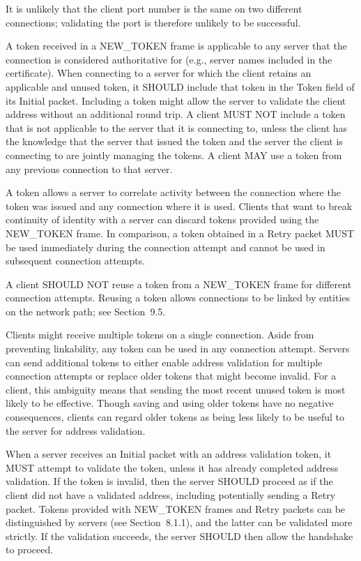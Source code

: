 \documentclass{article}
\begin{document}
It is unlikely that the client port number is the same on two different connections; validating the port is therefore unlikely to be successful.

A token received in a NEW\_TOKEN frame is applicable to any server that the connection is considered authoritative for (e.g., server names included in the certificate).  When connecting to a server for which the client retains an applicable and unused token, it SHOULD include that token in the Token field of its Initial packet. Including a token might allow the server to validate the client address without an additional round trip.  A client MUST NOT include a token that is not applicable to the server that it is connecting to, unless the client has the knowledge that the server that issued the token and the server the client is connecting to are jointly managing the tokens.  A client MAY use a token from any previous connection to that server.

A token allows a server to correlate activity between the connection where the token was issued and any connection where it is used. Clients that want to break continuity of identity with a server can discard tokens provided using the NEW\_TOKEN frame.  In comparison, a token obtained in a Retry packet MUST be used immediately during the connection attempt and cannot be used in subsequent connection attempts.

A client SHOULD NOT reuse a token from a NEW\_TOKEN frame for different connection attempts.  Reusing a token allows connections to be linked by entities on the network path; see Section~9.5.

Clients might receive multiple tokens on a single connection.  Aside from preventing linkability, any token can be used in any connection attempt.  Servers can send additional tokens to either enable address validation for multiple connection attempts or replace older tokens that might become invalid.  For a client, this ambiguity means that sending the most recent unused token is most likely to be effective. Though saving and using older tokens have no negative consequences, clients can regard older tokens as being less likely to be useful to the server for address validation.

When a server receives an Initial packet with an address validation token, it MUST attempt to validate the token, unless it has already completed address validation.  If the token is invalid, then the server SHOULD proceed as if the client did not have a validated address, including potentially sending a Retry packet.  Tokens provided with NEW\_TOKEN frames and Retry packets can be distinguished by servers (see Section~8.1.1), and the latter can be validated more strictly.  If the validation succeeds, the server SHOULD then allow the handshake to proceed.
\end{document}
